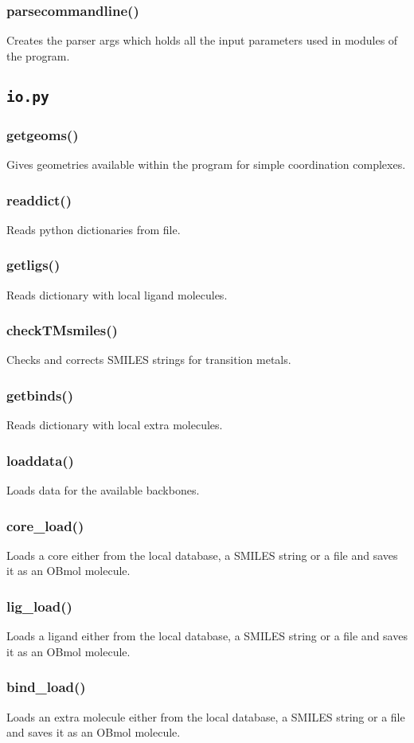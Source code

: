 \documentclass[a4paper,12pt]{assignment}
\begin{document}
\subsubsection{parsecommandline()}
Creates the parser args which holds all the input parameters used in modules of the program.

\subsection{\texttt{io.py}}
\subsubsection{getgeoms()}
Gives geometries available within the program for simple coordination complexes.
\subsubsection{readdict()}
Reads python dictionaries from file.
\subsubsection{getligs()}
Reads dictionary with local ligand molecules.
\subsubsection{checkTMsmiles()}
Checks and corrects SMILES strings for transition metals.
\subsubsection{getbinds()}
Reads dictionary with local extra molecules.
\subsubsection{loaddata()}
Loads data for the available backbones.
\subsubsection{core\_load()}
Loads a core either from the local database, a SMILES string or a file and saves it as an OBmol molecule.
\subsubsection{lig\_load()}
Loads a ligand either from the local database, a SMILES string or a file and saves it as an OBmol molecule.
\subsubsection{bind\_load()}
Loads an extra molecule either from the local database, a SMILES string or a file and saves it as an OBmol molecule.
\end{document}
